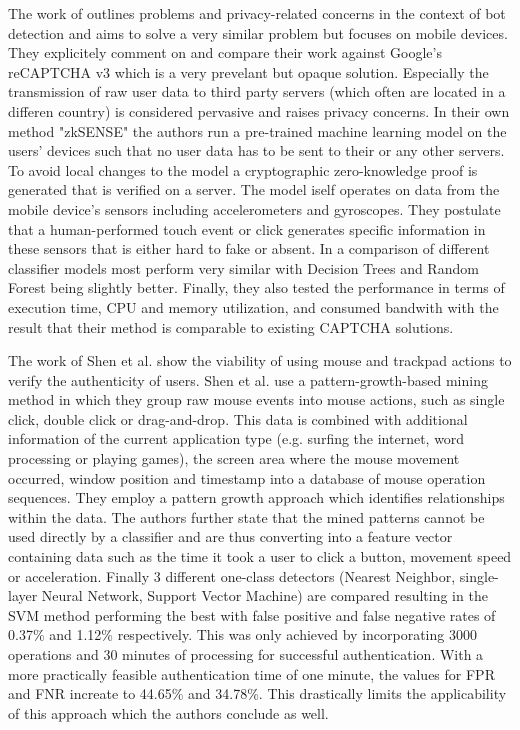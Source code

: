 \documentclass[
    fontsize=12pt,
    headings=small,
    parskip=half,           %
    bibliography=totoc,
    numbers=noenddot,       %
    open=any,               %
    final,                   %
    table
]{scrreprt}
\begin{document}
The work of \cite{PETS2021} outlines problems and privacy-related concerns in the context of bot detection and aims to solve a very similar problem but focuses on mobile devices. They explicitely comment on and compare their work against Google's reCAPTCHA v3 \cite{RECPATCHA_V3} which is a very prevelant but opaque solution. Especially the transmission of raw user data to third party servers (which often are located in a differen country) is considered pervasive and raises privacy concerns. In their own method "zkSENSE" the authors run a pre-trained machine learning model on the users' devices such that no user data has to be sent to their or any other servers. To avoid local changes to the model a cryptographic zero-knowledge proof is generated that is verified on a server. The model iself operates on data from the mobile device's sensors including accelerometers and gyroscopes. They postulate that a human-performed touch event or click generates specific information in these sensors that is either hard to fake or absent. In a comparison of different classifier models most perform very similar with Decision Trees and Random Forest being slightly better. Finally, they also tested the performance in terms of execution time, CPU and memory utilization, and consumed bandwith with the result that their method is comparable to existing CAPTCHA solutions.


The work of Shen et al. \cite{6263955} show the viability of using mouse and trackpad actions to verify the authenticity of users. Shen et al. use a pattern-growth-based mining method in which they group raw mouse events into mouse actions, such as single click, double click or drag-and-drop. This data is combined with additional information of the current application type (e.g. surfing the internet, word processing or playing games), the screen area where the mouse movement occurred, window position and timestamp into a database of mouse operation sequences. They employ a pattern growth approach which identifies relationships within the data. The authors further state that the mined patterns cannot be used directly by a classifier and are thus converting into a feature vector containing data such as the time it took a user to click a button, movement speed or acceleration. Finally 3 different one-class detectors (Nearest Neighbor, single-layer Neural Network, Support Vector Machine) are compared resulting in the SVM method performing the best with false positive and false negative rates of 0.37\% and 1.12\% respectively. This was only achieved by incorporating 3000 operations and 30 minutes of processing for successful authentication. With a more practically feasible authentication time of one minute, the values for FPR and FNR increate to 44.65\% and 34.78\%. This drastically limits the applicability of this approach which the authors conclude as well.
\end{document}
